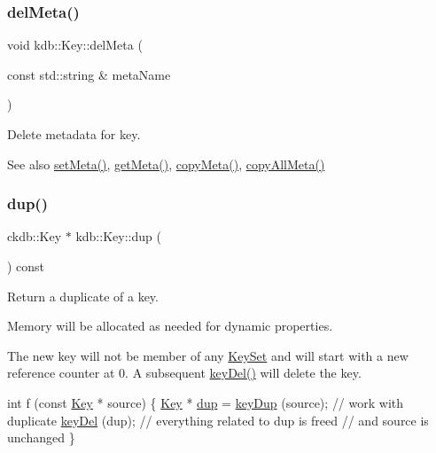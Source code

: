 \subsubsection{\texorpdfstring{del\+Meta()}{delMeta()}}
{\footnotesize\ttfamily void kdb\+::\+Key\+::del\+Meta (\begin{DoxyParamCaption}\item[{const std\+::string \&}]{meta\+Name }\end{DoxyParamCaption})\hspace{0.3cm}{\ttfamily [inline]}}



Delete metadata for key. 

\begin{DoxySeeAlso}{See also}
\hyperlink{classkdb_1_1Key_a4c5a3d463127ade0b766c4298002daa3}{set\+Meta()}, \hyperlink{classkdb_1_1Key_acdd4e81b0565756c99826bf926fd6fe4}{get\+Meta()}, \hyperlink{classkdb_1_1Key_a53f6d2196a7f17c4bdc544207bdc5f4c}{copy\+Meta()}, \hyperlink{classkdb_1_1Key_aec0910bf293db33deac6a3f81359cb48}{copy\+All\+Meta()} 
\end{DoxySeeAlso}
\mbox{\label{classkdb_1_1Key_ababb1ccd9f18db379eb4a62f8db87bf5}} 
\subsubsection{\texorpdfstring{dup()}{dup()}}
{\footnotesize\ttfamily ckdb\+::\+Key $\ast$ kdb\+::\+Key\+::dup (\begin{DoxyParamCaption}{ }\end{DoxyParamCaption}) const\hspace{0.3cm}{\ttfamily [inline]}}



Return a duplicate of a key. 

Memory will be allocated as needed for dynamic properties.

The new key will not be member of any \hyperlink{classkdb_1_1KeySet}{Key\+Set} and will start with a new reference counter at 0. A subsequent \hyperlink{group__key_ga3df95bbc2494e3e6703ece5639be5bb1}{key\+Del()} will delete the key.


\begin{DoxyCode}
\textcolor{keywordtype}{int} f (\textcolor{keyword}{const} \hyperlink{classkdb_1_1Key_a5679f5cae63caddd64a60388b9cc77fa}{Key} * source)
\{
        \hyperlink{classkdb_1_1Key_a5679f5cae63caddd64a60388b9cc77fa}{Key} * \hyperlink{classkdb_1_1Key_ababb1ccd9f18db379eb4a62f8db87bf5}{dup} = \hyperlink{group__key_gae6ec6a60cc4b8c1463fa08623d056ce3}{keyDup} (source);
        \textcolor{comment}{// work with duplicate}
        \hyperlink{group__key_ga3df95bbc2494e3e6703ece5639be5bb1}{keyDel} (dup);
        \textcolor{comment}{// everything related to dup is freed}
        \textcolor{comment}{// and source is unchanged}
\}
\end{DoxyCode}



